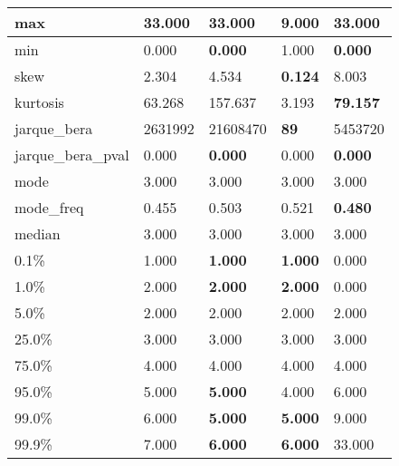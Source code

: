 \begin{table}[H]
\begin{tabular}{|l|m{10em}|m{10em}|m{10em}|m{10em}|}
\hline max & 33.000 & \bfseries 33.000 & \cellcolor[rgb]{0.9, 0.54, 0.52} 9.000 & \bfseries 33.000 \\
\hline min & 0.000 & \bfseries 0.000 & \cellcolor[rgb]{0.9, 0.54, 0.52} 1.000 & \bfseries 0.000 \\
\hline skew & 2.304 & 4.534 & \bfseries 0.124 & \cellcolor[rgb]{0.9, 0.54, 0.52} 8.003 \\
\hline kurtosis & 63.268 & \cellcolor[rgb]{0.9, 0.54, 0.52} 157.637 & 3.193 & \bfseries 79.157 \\
\hline jarque\_bera & 2631992 & \cellcolor[rgb]{0.9, 0.54, 0.52} 21608470 & \bfseries 89 & 5453720 \\
\hline jarque\_bera\_pval & 0.000 & \bfseries 0.000 & \cellcolor[rgb]{0.9, 0.54, 0.52} 0.000 & \bfseries 0.000 \\
\hline mode & 3.000 & 3.000 & 3.000 & 3.000 \\
\hline mode\_freq & 0.455 & 0.503 & \cellcolor[rgb]{0.9, 0.54, 0.52} 0.521 & \bfseries 0.480 \\
\hline median & 3.000 & 3.000 & 3.000 & 3.000 \\
\hline 0.1\% & 1.000 & \bfseries 1.000 & \bfseries 1.000 & \cellcolor[rgb]{0.9, 0.54, 0.52} 0.000 \\
\hline 1.0\% & 2.000 & \bfseries 2.000 & \bfseries 2.000 & \cellcolor[rgb]{0.9, 0.54, 0.52} 0.000 \\
\hline 5.0\% & 2.000 & 2.000 & 2.000 & 2.000 \\
\hline 25.0\% & 3.000 & 3.000 & 3.000 & 3.000 \\
\hline 75.0\% & 4.000 & 4.000 & 4.000 & 4.000 \\
\hline 95.0\% & 5.000 & \bfseries 5.000 & \cellcolor[rgb]{0.9, 0.54, 0.52} 4.000 & \cellcolor[rgb]{0.9, 0.54, 0.52} 6.000 \\
\hline 99.0\% & 6.000 & \bfseries 5.000 & \bfseries 5.000 & \cellcolor[rgb]{0.9, 0.54, 0.52} 9.000 \\
\hline 99.9\% & 7.000 & \bfseries 6.000 & \bfseries 6.000 & \cellcolor[rgb]{0.9, 0.54, 0.52} 33.000 \\
\hline
\end{tabular}
\end{table}
